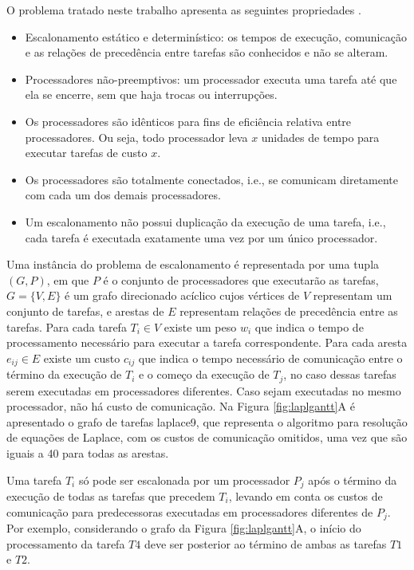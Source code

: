 \documentclass[fleqn,10pt]{SelfArx} %
\begin{document}
O problema tratado neste trabalho apresenta as seguintes propriedades \cite{Hou1994}.

\begin{itemize}
\item Escalonamento estático e determinístico: os tempos de execução, comunicação e as relações de precedência entre tarefas são conhecidos e não se alteram.
\item Processadores não-preemptivos: um processador executa uma tarefa até que ela se encerre, sem que haja trocas ou interrupções.
\item Os processadores são idênticos para fins de eficiência relativa entre processadores. Ou seja, todo processador leva \(x\) unidades de tempo para executar tarefas de custo \(x\).
\item Os processadores são totalmente conectados, i.e., se comunicam diretamente com cada um dos demais processadores.
\item Um escalonamento não possui duplicação da execução de uma tarefa, i.e., cada tarefa é executada exatamente uma vez por um único processador.
\end{itemize}

Uma instância do problema de escalonamento é representada por uma tupla \((G,P)\), em que \(P\) é o conjunto de processadores que executarão as tarefas, \(G = \{V,E\}\) é um grafo direcionado acíclico cujos vértices de \(V\) representam um conjunto de tarefas, e arestas de \(E\) representam relações de precedência entre as tarefas. Para cada tarefa \(T_i \in V\) existe um peso \(w_i\) que indica o tempo de processamento necessário para executar a tarefa correspondente. Para cada aresta \(e_{ij} \in E\) existe um custo \(c_{ij}\) que indica o tempo necessário de comunicação entre o término da execução de \(T_i\) e o começo da execução de \(T_j\), no caso dessas tarefas serem executadas em processadores diferentes. Caso sejam executadas no mesmo processador, não há custo de comunicação. Na Figura \ref{fig:laplgantt}A é apresentado o grafo de tarefas laplace9, que representa o algoritmo para resolução de equações de Laplace, com os custos de comunicação omitidos, uma vez que são iguais a 40 para todas as arestas.

Uma tarefa \(T_i\) só pode ser escalonada por um processador \(P_j\) após o término da execução de todas as tarefas que precedem \(T_i\), levando em conta os custos de comunicação para predecessoras executadas em processadores diferentes de \(P_j\). Por exemplo, considerando o grafo da Figura \ref{fig:laplgantt}A, o início do processamento da tarefa $T4$ deve ser posterior ao término de ambas as tarefas $T1$ e $T2$.
\end{document}
